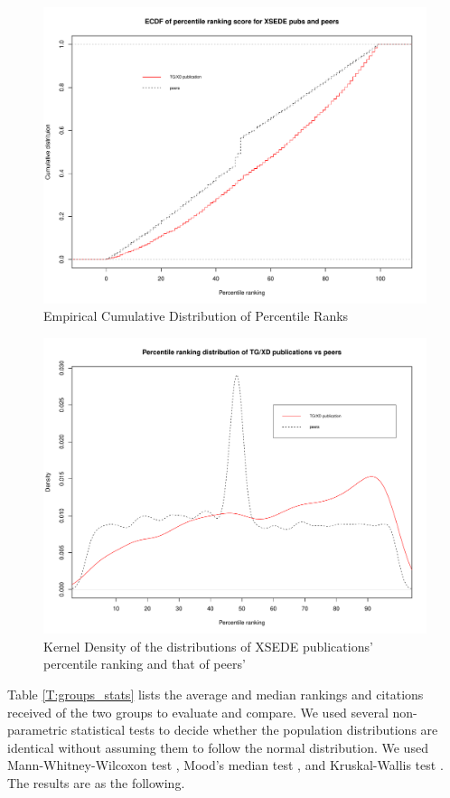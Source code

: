 \documentclass{sig-alternate}
\begin{document}
\begin{figure}[htb!]
    \includegraphics[width=0.95\columnwidth]{images/ptranking_CDF.pdf}
    \caption{Empirical Cumulative Distribution of Percentile Ranks}
    \label{F:ptranking_cdf}
\end{figure}

\begin{figure}[htb!]
    \includegraphics[width=0.95\columnwidth]{images/ptranking_distribution.pdf}
    \caption{Kernel Density of the distributions
of XSEDE publications' percentile ranking and that of peers'}
    \label{F:xd_peers_density}
\end{figure}

Table \ref{T:groups_stats} lists the average and median rankings and citations
received of the two groups to evaluate and compare.
We used several non-parametric statistical tests to decide whether the population distributions
are identical without assuming them to follow the normal distribution.
We used Mann-Whitney-Wilcoxon test \cite{mann1947test}, Mood's median test \cite{brown1951median},
and Kruskal-Wallis test \cite{kruskal1952use}. The results are as the following.
\end{document}
